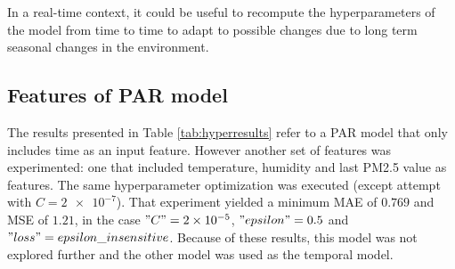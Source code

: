 In a real-time context, it could be useful to recompute the hyperparameters of the model from time to time to adapt to possible changes due to long term seasonal changes in the environment.

\begin{table}[h]
\centering
{}
\caption{Grid search results}
\label{tab:hyperresults}
\end{table}

\subsection{Features of PAR model}
The results presented in Table \ref{tab:hyperresults} refer to a PAR model that only includes time as an input feature. However another set of features was experimented: one that included temperature, humidity and last PM2.5 value as features. The same hyperparameter optimization was executed (except attempt with $C=\num{2e-7}$). That experiment yielded a minimum MAE of $0.769$ and MSE of $1.21$, in the case $"C"= \num{2e-5}$, $"epsilon" = 0.5$ and $"loss" = epsilon\_insensitive$. Because of these results, this model was not explored further and the other model was used as the temporal model.

